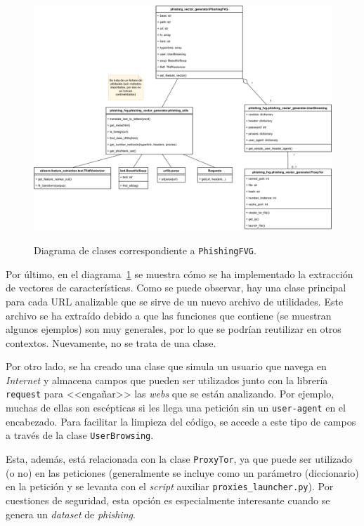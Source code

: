 \begin{figure}[h]
	\caption[Diagrama: clases (\texttt{PhishingFVG})]{Diagrama de clases correspondiente a \texttt{PhishingFVG}.}
	\centering
	\includegraphics[width=\textwidth]{../img/anexos/diagrams/classes-fvg}
	\label{c:classes-fvg}
\end{figure}

Por último, en el diagrama~\ref{c:classes-fvg} se muestra cómo se ha implementado la extracción de vectores de características. Como se puede observar, hay una clase principal para cada URL analizable que se sirve de un nuevo archivo de utilidades. Este archivo se ha extraído debido a que las funciones que contiene (se muestran algunos ejemplos) son muy generales, por lo que se podrían reutilizar en otros contextos. Nuevamente, no se trata de una clase.

Por otro lado, se ha creado una clase que simula un usuario que navega en \textit{Internet} y almacena campos que pueden ser utilizados junto con la librería \texttt{request} para <<engañar>> las \textit{webs} que se están analizando. Por ejemplo, muchas de ellas son escépticas si les llega una petición sin un \texttt{user-agent} en el encabezado. Para facilitar la limpieza del código, se accede a este tipo de campos a través de la clase \texttt{UserBrowsing}.

Esta, además, está relacionada con la clase \texttt{ProxyTor}, ya que puede ser utilizado (o no) en las peticiones (generalmente se incluye como un parámetro (diccionario) en la petición y se levanta con el \textit{script} auxiliar \texttt{proxies\_launcher.py}). Por cuestiones de seguridad, esta opción es especialmente interesante cuando se genera un \textit{dataset} de \textit{phishing}.

